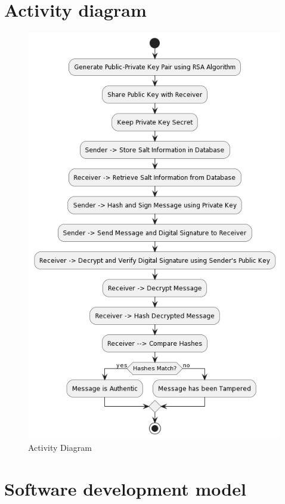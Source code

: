 \section{Activity diagram}
\begin{figure}[H]
	\centering
	\includegraphics[width=150mm, height=180mm]{images/activity.png}
	\caption{Activity Diagram} %
	\label{figactivity} %
\end{figure}

\pagebreak
\section{Software development model}
